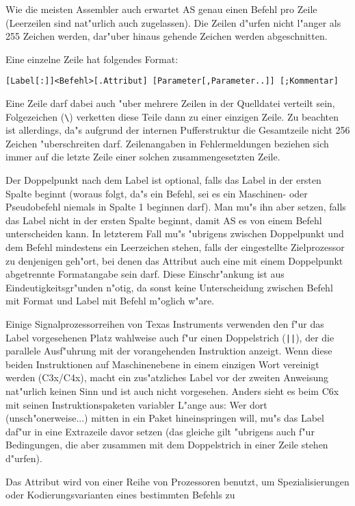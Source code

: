 \documentclass[12pt,a4paper,twoside]{report}
\begin{document}
Wie die meisten Assembler auch erwartet AS genau einen Befehl pro Zeile
(Leerzeilen sind nat"urlich auch zugelassen).  Die Zeilen d"urfen nicht
l"anger als 255 Zeichen werden, dar"uber hinaus gehende Zeichen werden
abgeschnitten.
\par
Eine einzelne Zeile hat folgendes Format:
\begin{verbatim}
[Label[:]]<Befehl>[.Attribut] [Parameter[,Parameter..]] [;Kommentar]
\end{verbatim}
Eine Zeile darf dabei auch "uber mehrere Zeilen in der Quelldatei
verteilt sein, Folgezeichen (\verb!\!) verketten diese Teile dann zu
einer einzigen Zeile.  Zu beachten ist allerdings, da"s aufgrund der
internen Pufferstruktur die Gesamtzeile nicht 256 Zeichen "uberschreiten
darf.  Zeilenangaben in Fehlermeldungen beziehen sich immer auf die
letzte Zeile einer solchen zusammengesetzten Zeile.
\par
Der Doppelpunkt nach dem Label ist optional, falls das Label in der
ersten Spalte beginnt (woraus folgt, da"s ein Befehl, sei es ein
Maschinen- oder Pseudobefehl niemals in Spalte 1 beginnen darf).
Man mu"s ihn aber setzen, falls das Label nicht in der ersten Spalte
beginnt, damit AS es von einem Befehl unterscheiden kann.  In letzterem
Fall mu"s "ubrigens zwischen Doppelpunkt und dem Befehl mindestens ein
Leerzeichen stehen, falls der eingestellte Zielprozessor zu denjenigen
geh"ort, bei denen das Attribut auch eine mit einem Doppelpunkt
abgetrennte Formatangabe sein darf.  Diese Einschr"ankung ist aus
Eindeutigkeitsgr"unden n"otig, da sonst keine Unterscheidung zwischen
Befehl mit Format und Label mit Befehl m"oglich w"are.
\par
Einige Signalprozessorreihen von Texas Instruments verwenden den f"ur das
Label vorgesehenen Platz wahlweise auch f"ur einen Doppelstrich
(\verb!||!), der die parallele Ausf"uhrung mit der vorangehenden
Instruktion anzeigt.  Wenn diese beiden Instruktionen auf Maschinenebene
in einem einzigen Wort vereinigt werden (C3x/C4x), macht ein zus"atzliches
Label vor der zweiten Anweisung nat"urlich keinen Sinn und ist auch nicht
vorgesehen.  Anders sieht es beim C6x mit seinen Instruktionspaketen
variabler L"ange aus: Wer dort (unsch"onerweise...) mitten in ein Paket
hineinspringen will, mu"s das Label daf"ur in eine Extrazeile davor setzen
(das gleiche gilt "ubrigens auch f"ur Bedingungen, die aber zusammen mit
dem Doppelstrich in einer Zeile stehen d"urfen).
\par
Das Attribut wird von einer Reihe von Prozessoren benutzt, um
Spezialisierungen oder Kodierungsvarianten eines bestimmten Befehls zu
\end{document}
